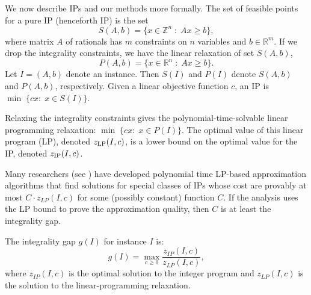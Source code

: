 We now describe IPs and our methods more formally. The set of feasible points for a pure IP (henceforth IP) is the set
\begin{equation}
S(A,b)= \{x\in \mathbb{Z}^{n}\;:\; Ax\geq b\}  \label{S},
\end{equation}
where matrix $A$ of rationals has $m$ constraints on $n$ variables and $b \in \mathbb{R}^{m}$.
If we drop the integrality constraints, we have the linear relaxation of set $S(A,b)$,
\begin{equation}
P(A,b) = \{x\in \mathbb{R}^{n}\;:\; Ax\geq b\}. \label{P}
\end{equation}
Let $I=(A,b)$ denote an instance. Then $S(I)$ and $P(I)$ denote $S(A,b)$ and $P(A,b)$, respectively. Given a linear objective function $c$, an IP is $\min \;\{cx:\; x \in S(I)\}$. 

Relaxing the integrality constraints gives the polynomial-time-solvable linear programming relaxation: $\min \;\{cx:\;x\in P(I) \}$.  The optimal value of this linear program (LP), denoted $z_{\operatorname{LP}}(I,c)$, is a lower bound on the optimal value for the IP, denoted $z_{\operatorname{IP}}(I,c)$. 

Many researchers (see \cite{davids,vazirani}) have developed polynomial time LP-based approximation algorithms that find solutions for special classes of IPs whose cost are provably at most $C\cdot z_{LP}(I,c)$ for some (possibly constant) function $C$. If the analysis uses the LP bound to prove the approximation quality, then $C$ is at least the integrality gap.
\begin{definition}
The integrality gap $g(I)$ for instance $I$ is: $$g(I)= \max_{c\geq 0}\frac{z_{IP}(I,c)}{z_{LP}(I,c)},$$
where $z_{IP}(I,c)$ is the optimal solution to the integer program and $z_{LP}(I,c)$ is the solution to the linear-programming relaxation.
\end{definition}

